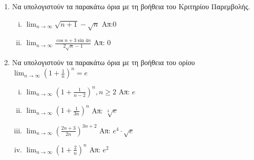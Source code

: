 \begin{enumerate}
    \item Να υπολογιστούν τα παρακάτω όρια με τη βοήθεια του Κριτηρίου 
        Παρεμβολής.

        \begin{enumerate}[i)]
            \item $ \lim_{n \to \infty} \sqrt{n+1} - \sqrt{n}  $ \hfill Απ:0
            \item $ \lim_{n \to \infty} \frac{\cos{n} + 3 \sin{4n}}{ 2
                \sqrt{n} -1} $ \hfill Απ: 0  
        \end{enumerate}

    \item Να υπολογιστούν τα παρακάτω όρια με τη βοήθεια του ορίου 
        $ \lim_{n \to \infty} \left(1+ \frac{1}{n}\right)^{n}=e $

        \begin{enumerate}[i)]
            \item $ \lim_{n \to \infty} \left(1+ \frac{1}{n-2}\right)^{n}, 
                n \geq 2 $ 
                \hfill Απ: $e$  
            \item $ \lim_{n \to \infty} \left(1 + \frac{1}{3n}\right)^{n} $ 
                \hfill Απ: $ \sqrt[3]{e} $ 
            \item $ \lim_{n \to \infty} \left(\frac{2n +3}{2n} 
                \right)^{3n+2}  $
                \hfill Απ: $ e^{4}\cdot \sqrt{e} $ 
            \item $ \lim_{n \to \infty} \left(1+ \frac{2}{n}\right)^{n} $ 
                \hfill Απ: $ e^{2} $ 
        \end{enumerate}
\end{enumerate}




